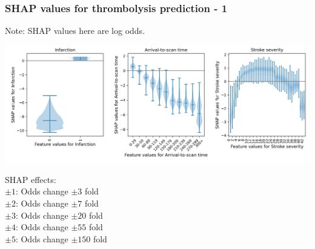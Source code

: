 \begin{frame}
\frametitle{SHAP values for thrombolysis prediction - 1}
Note: SHAP values here are log odds. 
\begin{center}
\includegraphics[width=1.0\textwidth]{./images/03d_xgb_10_features_thrombolysis_shap_violin_1.jpg}
\end{center}

\scriptsize
SHAP effects: \\
$\pm1$: Odds change $\pm3$ fold\\
$\pm2$: Odds change $\pm7$ fold\\
$\pm3$: Odds change $\pm20$ fold\\
$\pm4$: Odds change $\pm55$ fold\\
$\pm5$: Odds change $\pm150$ fold
\end{frame}